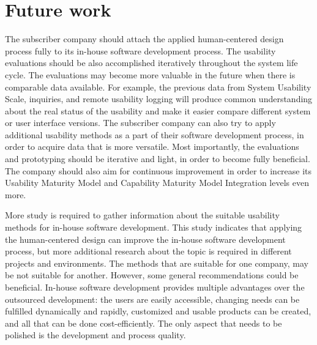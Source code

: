 \documentclass[12pt,a4paper,oneside,pdftex]{report}
\begin{document}
\section{Future work}
\label{sec:future}
The subscriber company should attach the applied human-centered design process fully to its in-house software development process. The usability evaluations should be also accomplished iteratively throughout the system life cycle. 
The evaluations may become more valuable in the future when there is comparable data available. For example, the previous data from System Usability Scale, inquiries, and remote usability logging will produce common understanding about the real status of the usability and make it easier compare different system or user interface versions. The subscriber company can also try to apply additional usability methods as a part of their software development process, in order to acquire data that is more versatile. Most importantly, the evaluations and prototyping should be iterative and light, in order to become fully beneficial. The company should also aim for continuous improvement in order to increase its Usability Maturity Model and Capability Maturity Model Integration levels even more. 
	
More study is required to gather information about the suitable usability methods for in-house software development. This study indicates that applying the human-centered design can improve the in-house software development process, but more additional research about the topic is required in different projects and environments. The methods that are suitable for one company, may be not suitable for another. However, some general recommendations could be beneficial. In-house software development provides multiple advantages over the outsourced development: the users are easily accessible, changing needs can be fulfilled dynamically and rapidly, customized and usable products can be created, and all that can be done cost-efficiently. The only aspect that needs to be polished is the development and process quality.

%	
	
\end{document}
